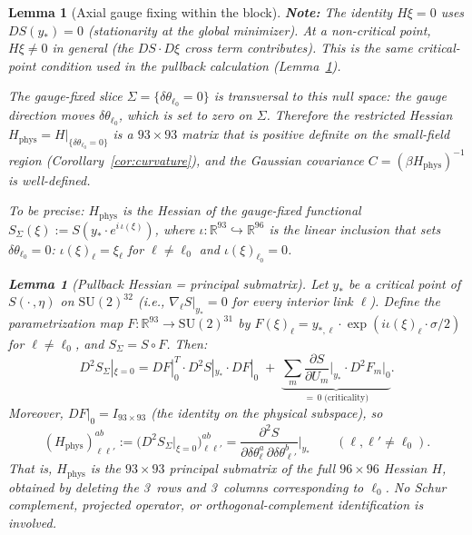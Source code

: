 \documentclass[11pt]{article}
\newtheorem{lemma}[theorem]{Lemma}
\theoremstyle{definition}
\newcommand{\SU}{\mathrm{SU}}
\newcommand{\R}{\mathbb{R}}
\begin{document}
\begin{lemma}[Axial gauge fixing within the block]
\textbf{Note:} The identity $H\xi=0$ uses $DS(y_*)=0$
(stationarity at the global minimizer).  At a non-critical point,
$H\xi\ne 0$ in general (the $DS\cdot D\xi$ cross term
contributes).  This is the same critical-point condition used in
the pullback calculation (Lemma~\ref{lem:pullback-hessian}).

The gauge-fixed slice $\Sigma=\{\delta\theta_{\ell_0}=0\}$ is
transversal to this null space: the gauge direction moves
$\delta\theta_{\ell_0}$, which is set to zero on $\Sigma$.
Therefore the restricted Hessian
$H_{\mathrm{phys}}=H|_{\{\delta\theta_{\ell_0}=0\}}$ is a
$93\times 93$ matrix that is positive definite on the small-field
region (Corollary~\ref{cor:curvature}), and the Gaussian covariance
$C=(\beta H_{\mathrm{phys}})^{-1}$ is well-defined.

To be precise: $H_{\mathrm{phys}}$ is the Hessian of the
gauge-fixed functional $S_\Sigma(\xi):=S(y_*\cdot e^{i\,\iota(\xi)})$,
where $\iota:\R^{93}\hookrightarrow\R^{96}$ is the linear
inclusion that sets $\delta\theta_{\ell_0}=0$:
$\iota(\xi)_\ell=\xi_\ell$ for $\ell\ne\ell_0$ and
$\iota(\xi)_{\ell_0}=0$.

\begin{lemma}[Pullback Hessian = principal submatrix]%
\label{lem:pullback-hessian}
Let $y_*$ be a critical point of
$S(\cdot\,,\eta)$ on $\SU(2)^{32}$ (i.e.,
$\nabla_\ell S|_{y_*}=0$ for every interior link $\ell$).
Define the parametrization map $F:\R^{93}\to\SU(2)^{31}$ by
$F(\xi)_\ell=y_{*,\ell}\cdot\exp(i\iota(\xi)_\ell\cdot\sigma/2)$
for $\ell\ne\ell_0$, and $S_\Sigma=S\circ F$.
Then:
\begin{equation}\label{eq:hessian-pullback}
D^2 S_\Sigma|_{\xi=0}
=DF|_0^T\cdot D^2 S|_{y_*}\cdot DF|_0
\;+\;\underbrace{\sum_m\frac{\partial S}{\partial U_m}\bigg|_{y_*}
\cdot D^2 F_m|_0}_{=\,0\;\text{(criticality)}}.
\end{equation}
Moreover, $DF|_0=I_{93\times 93}$ (the identity on the physical
subspace), so
\begin{equation}\label{eq:Hphys-submatrix}
(H_{\mathrm{phys}})_{\ell\ell'}^{ab}
:=\bigl(D^2 S_\Sigma|_{\xi=0}\bigr)_{\ell\ell'}^{ab}
=\frac{\partial^2 S}{\partial\delta\theta_\ell^a\,
\partial\delta\theta_{\ell'}^b}\bigg|_{y_*}
\qquad(\ell,\ell'\ne\ell_0).
\end{equation}
That is, $H_{\mathrm{phys}}$ is the $93\times 93$
\emph{principal submatrix} of the full $96\times 96$ Hessian
$H$, obtained by deleting the 3~rows and 3~columns
corresponding to $\ell_0$.  No Schur complement, projected
operator, or orthogonal-complement identification is involved.
\end{lemma}


\end{lemma}
\end{document}
